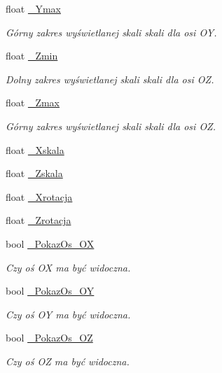 \begin{DoxyCompactItemize}
float \hyperlink{class_pz_g_1_1_lacze_do_g_n_u_plota_ad7dfd3fad82ea0720ec89eacc18410bf}{\+\_\+\+Ymax}
\begin{DoxyCompactList}\small\item\em Górny zakres wyświetlanej skali skali dla osi {\itshape OY}. \end{DoxyCompactList}\item 
float \hyperlink{class_pz_g_1_1_lacze_do_g_n_u_plota_a8f9797e881df35f4206cb7d8030e5edc}{\+\_\+\+Zmin}
\begin{DoxyCompactList}\small\item\em Dolny zakres wyświetlanej skali skali dla osi {\itshape OZ}. \end{DoxyCompactList}\item 
float \hyperlink{class_pz_g_1_1_lacze_do_g_n_u_plota_a26949eedd421832f0f206ce3c8f90694}{\+\_\+\+Zmax}
\begin{DoxyCompactList}\small\item\em Górny zakres wyświetlanej skali skali dla osi {\itshape OZ}. \end{DoxyCompactList}\item 
float \hyperlink{class_pz_g_1_1_lacze_do_g_n_u_plota_a2c9303c4dbb4c9f0ddc4f1fe02eb3f70}{\+\_\+\+Xskala}
\item 
float \hyperlink{class_pz_g_1_1_lacze_do_g_n_u_plota_a85446d06b2d714b2f852ef43c47c73c1}{\+\_\+\+Zskala}
\item 
float \hyperlink{class_pz_g_1_1_lacze_do_g_n_u_plota_a21e77f0a2bfb7fed989b6dc2d64b5a7e}{\+\_\+\+Xrotacja}
\item 
float \hyperlink{class_pz_g_1_1_lacze_do_g_n_u_plota_aa65781b1ff96dfb31a780e98ee28d6ed}{\+\_\+\+Zrotacja}
\item 
bool \hyperlink{class_pz_g_1_1_lacze_do_g_n_u_plota_a833aa8994b9913786f920ec8c259731f}{\+\_\+\+Pokaz\+Os\+\_\+\+OX}
\begin{DoxyCompactList}\small\item\em Czy oś OX ma być widoczna. \end{DoxyCompactList}\item 
bool \hyperlink{class_pz_g_1_1_lacze_do_g_n_u_plota_ae8d9b4dac5eae6ce86b7043c45b70ed8}{\+\_\+\+Pokaz\+Os\+\_\+\+OY}
\begin{DoxyCompactList}\small\item\em Czy oś OY ma być widoczna. \end{DoxyCompactList}\item 
bool \hyperlink{class_pz_g_1_1_lacze_do_g_n_u_plota_a5b0afc06dc248790d2e7475b2162e309}{\+\_\+\+Pokaz\+Os\+\_\+\+OZ}
\begin{DoxyCompactList}\small\item\em Czy oś OZ ma być widoczna. \end{DoxyCompactList}\end{DoxyCompactItemize}
